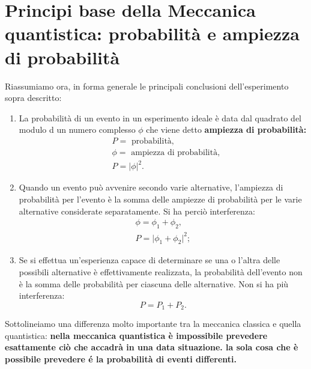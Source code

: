 \section[Probabilità e ampiezza di probabilità]{Principi base della Meccanica quantistica: probabilità e ampiezza di probabilità}
Riassumiamo ora, in forma generale le principali conclusioni dell'esperimento sopra descritto:
\begin{enumerate}
\item La probabilità di un evento in un esperimento ideale è data dal quadrato del modulo d un numero complesso $\phi$ che viene detto \textbf{ampiezza di probabilità:}
	\begin{equation}
		\boxed{
			\begin{aligned}
			&P= \textrm{ probabilità}, \\
			&\phi = \textrm{ ampiezza di probabilità}, \\
			&P = \lvert \phi \rvert ^2 .
			\end{aligned}
			}
	\end{equation}
\item Quando un evento può avvenire secondo varie alternative, l'ampiezza di probabilità per l'evento è la somma delle ampiezze di probabilità per le varie alternative considerate separatamente. Si ha perciò interferenza:
	\begin{equation}
		\boxed{
			\begin{aligned}
			&\phi = \phi_1 + \phi _2,&  \\
			&P = \lvert \phi_1 + \phi _2 \rvert ^2;&
			\end{aligned}
			}
	\end{equation}
\item Se si effettua un'esperienza capace di determinare se una o l'altra delle possibili alternative è effettivamente realizzata, la probabilità dell'evento non è la somma delle probabilità per ciascuna delle alternative. Non si ha più interferenza:
	\begin{equation}
		\boxed{
			P= P_1 + P_2.
			}
	\end{equation}
\end{enumerate}

Sottolineiamo una differenza molto importante tra la meccanica classica e quella quantistica: \textbf{nella meccanica quantistica è impossibile prevedere esattamente ciò che accadrà in una data situazione. la sola cosa che è possibile prevedere é la probabilità di eventi differenti.}
